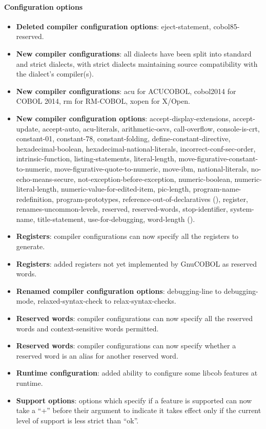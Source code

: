 \paragraph{Configuration options}
\begin{itemize}
\item \textbf{Deleted compiler configuration options}: eject-statement, cobol85-reserved.
\item \textbf{New compiler configurations}: all dialects have been split into standard and strict dialects, with strict dialects maintaining source compatibility with the dialect's compiler(s).
\item \textbf{New compiler configurations}: acu for ACUCOBOL, cobol2014 for COBOL 2014, rm for RM-COBOL, xopen for X\slash{}Open.
\item \textbf{New compiler configuration options}: accept-display-extensions, accept-update, accept-auto, acu-literals, arithmetic-osvs, call-overflow, console-is-crt, constant-01, constant-78, constant-folding, define-constant-directive, hexadecimal-boolean, hexadecimal-national-literals, incorrect-conf-sec-order, intrinsic-function, listing-statements, literal-length, move-figurative-constant-to-numeric, move-figurative-quote-to-numeric, move-ibm, national-literals, no-echo-means-secure, not-exception-before-exception, numeric-boolean, numeric-literal-length, numeric-value-for-edited-item, pic-length, program-name-redefinition, program-prototypes, reference-out-of-declaratives (), register, renames-uncommon-levels, reserved, reserved-words, stop-identifier, system-name, title-statement, use-for-debugging, word-length (). %
\item \textbf{Registers}: compiler configurations can now specify all the registers to generate.
\item \textbf{Registers}: added registers not yet implemented by GnuCOBOL as reserved words.
\item \textbf{Renamed compiler configuration options}: debugging-line to debugging-mode, relaxed-syntax-check to relax-syntax-checks.
\item \textbf{Reserved words}: compiler configurations can now specify all the reserved words and context-sensitive words permitted.
\item \textbf{Reserved words}: compiler configurations can now specify whether a reserved word is an alias for another reserved word. %
\item \textbf{Runtime configuration}: added ability to configure some libcob features at runtime.
\item \textbf{Support options}: options which specify if a feature is supported can now take a ``+'' before their argument to indicate it takes effect only if the current level of support is less strict than ``ok''.
\end{itemize}


